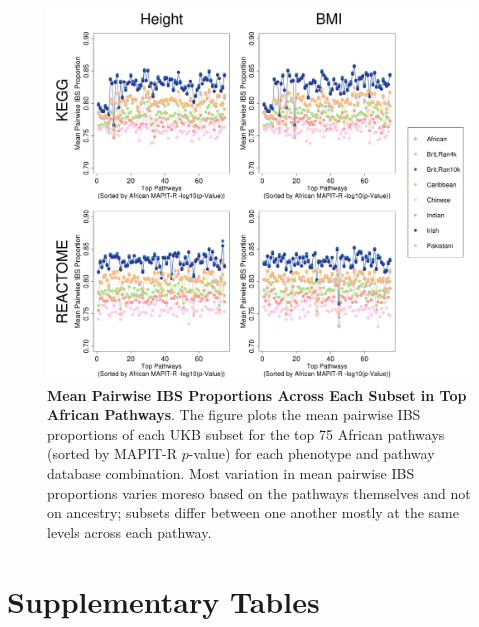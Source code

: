\documentclass[12pt, a4paper]{article}
\begin{document}
\begin{figure}[htbp]
\centering
\includegraphics[scale=.35]{Images/Supp/InterPath_Supp_Figure_IBS_AllPopComps_vs2.png}
\caption[TBD]{\textbf{Mean Pairwise IBS Proportions Across Each Subset in Top African Pathways}. The figure plots the mean pairwise IBS proportions of each UKB subset for the top 75 African pathways (sorted by MAPIT-R $p$-value) for each phenotype and pathway database combination. Most variation in mean pairwise IBS proportions varies moreso based on the pathways themselves and not on ancestry; subsets differ between one another mostly at the same levels across each pathway.}
\label{InterPath-Supp-Figure-IBS-AllPopComps}
\end{figure}
\clearpage

\section{Supplementary Tables}\label{Supplementary-Tables}
\end{document}
